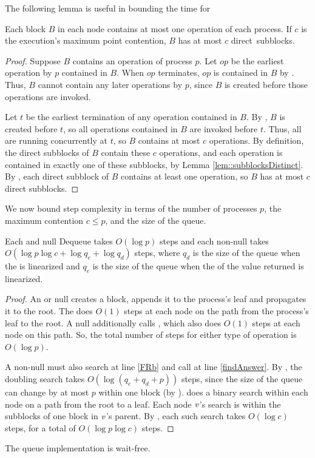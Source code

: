 The following lemma is useful in bounding the time for 
\begin{lemma}\label{blockSize}
Each block $B$ in each node contains at most one operation of each process.
If $c$ is the execution's maximum point contention, $B$ has at most $c$ direct~subblocks.
\end{lemma}
\begin{proof}
Suppose $B$ contains an operation of process $p$.
Let $op$ be the earliest operation by $p$ contained in $B$.
When $op$ terminates, $op$ is contained in $B$ by .
Thus, $B$ cannot contain any later operations by $p$, since $B$ is created before
those operations are invoked.

Let $t$ be the earliest termination of any operation contained in $B$.
By , $B$ is created before $t$, so all operations contained in $B$
are invoked before $t$.  Thus, all are  running concurrently at $t$, so $B$ contains at most $c$ operations.
By definition, the direct subblocks of $B$ contain these $c$ operations, and each operation is contained
in exactly one of these subblocks, by Lemma \ref{lem::subblocksDistinct}.
By , each direct subblock of $B$ contains at least one operation,
so $B$ has at most $c$ direct subblocks.
\end{proof}

We now bound step complexity in terms of the number of processes $p$, the maximum contention $c\leq p$, and the size of the queue. 

\begin{mytheorem}\label{enqDeqTime}
Each  and null Dequeue takes $O(\log p)$ steps 
and each non-null  takes
$O(\log p\log c + \log q_e+ \log q_d)$ steps,
where $q_d$ is the size of the queue when the  is linearized and 
$q_e$ is the size of the queue when the  of the value returned is linearized.
\end{mytheorem}
\begin{proof}
An  or null  creates a block, appends it to the process's 
leaf and propagates it to the root.  The   does $O(1)$ steps 
at each node on the path from the process's leaf to the root.
A null  additionally calls , which also does $O(1)$ steps
at each node on this path. 
So, the total number of steps for either type of operation is $O(\log p)$.

A non-null  must also search at line \ref{FRb} and call 
at line \ref{findAnswer}.
By , the doubling search takes $O(\log(q_e+q_d+p))$ steps,
since the size of the queue can change by at most $p$ within one block (by ).
 does a binary search within each node on a path from the root to a leaf.
Each node $\mbox{\textnormal{\textit{v}}}$'s search is within the subblocks of one block in $\mbox{\textnormal{\textit{v}}}$'s parent.
By , each such search takes $O(\log c)$ steps, for a total of $O(\log p\log c)$ steps.
\end{proof}

\begin{corollary}
The queue implementation is wait-free.
\end{corollary}
